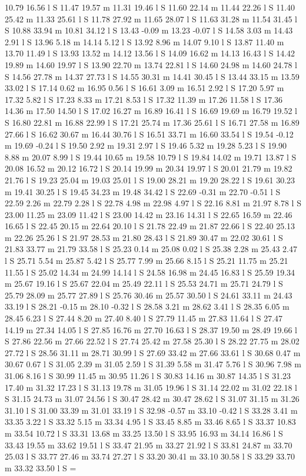 {10.79 16.56 l
S
11.47 19.57 m
11.31 19.46 l
S
11.60 22.14 m
11.44 22.26 l
S
11.40 25.42 m
11.33 25.61 l
S
11.78 27.92 m
11.65 28.07 l
S
11.63 31.28 m
11.54 31.45 l
S
10.88 33.94 m
10.81 34.12 l
S
13.43 -0.09 m
13.23 -0.07 l
S
14.58 3.03 m
14.43 2.91 l
S
13.96 5.18 m
14.14 5.12 l
S
13.92 8.96 m
14.07 9.10 l
S
13.87 11.40 m
13.70 11.49 l
S
13.93 13.52 m
14.12 13.56 l
S
14.09 16.62 m
14.13 16.43 l
S
14.42 19.89 m
14.60 19.97 l
S
13.90 22.70 m
13.74 22.81 l
S
14.60 24.98 m
14.60 24.78 l
S
14.56 27.78 m
14.37 27.73 l
S
14.55 30.31 m
14.41 30.45 l
S
13.44 33.15 m
13.59 33.02 l
S
17.14 0.62 m
16.95 0.56 l
S
16.61 3.09 m
16.51 2.92 l
S
17.20 5.97 m
17.32 5.82 l
S
17.23 8.33 m
17.21 8.53 l
S
17.32 11.39 m
17.26 11.58 l
S
17.36 14.36 m
17.50 14.50 l
S
17.02 16.27 m
16.89 16.41 l
S
16.69 19.69 m
16.79 19.52 l
S
16.80 22.81 m
16.88 22.99 l
S
17.21 25.74 m
17.36 25.61 l
S
16.71 27.58 m
16.89 27.66 l
S
16.62 30.67 m
16.44 30.76 l
S
16.51 33.71 m
16.60 33.54 l
S
19.54 -0.12 m
19.69 -0.24 l
S
19.50 2.92 m
19.31 2.97 l
S
19.46 5.32 m
19.28 5.23 l
S
19.90 8.88 m
20.07 8.99 l
S
19.44 10.65 m
19.58 10.79 l
S
19.84 14.02 m
19.71 13.87 l
S
20.08 16.52 m
20.12 16.72 l
S
20.14 19.99 m
20.34 19.97 l
S
20.01 21.79 m
19.82 21.76 l
S
19.23 25.04 m
19.03 25.01 l
S
19.00 28.21 m
19.20 28.22 l
S
19.61 30.23 m
19.41 30.25 l
S
19.45 34.23 m
19.48 34.42 l
S
22.69 -0.31 m
22.70 -0.51 l
S
22.59 2.26 m
22.79 2.28 l
S
22.78 4.98 m
22.98 4.97 l
S
22.16 8.81 m
21.97 8.78 l
S
23.00 11.25 m
23.09 11.42 l
S
23.00 14.42 m
23.16 14.31 l
S
22.65 16.59 m
22.46 16.65 l
S
22.45 20.15 m
22.64 20.10 l
S
21.78 22.49 m
21.87 22.66 l
S
22.40 25.13 m
22.26 25.26 l
S
21.97 28.53 m
21.80 28.43 l
S
21.89 30.47 m
22.02 30.61 l
S
21.83 33.77 m
21.79 33.58 l
S
25.23 0.14 m
25.08 0.02 l
S
25.38 2.28 m
25.43 2.47 l
S
25.71 5.54 m
25.87 5.42 l
S
25.77 7.99 m
25.66 8.15 l
S
25.21 11.75 m
25.21 11.55 l
S
25.02 14.34 m
24.99 14.14 l
S
24.58 16.98 m
24.45 16.83 l
S
25.59 19.34 m
25.67 19.16 l
S
25.67 22.04 m
25.49 22.11 l
S
25.53 24.71 m
25.71 24.79 l
S
25.79 28.09 m
25.77 27.89 l
S
25.76 30.46 m
25.57 30.50 l
S
24.61 33.11 m
24.43 33.19 l
S
28.21 -0.15 m
28.10 -0.32 l
S
28.58 3.21 m
28.62 3.41 l
S
28.35 6.05 m
28.45 6.23 l
S
27.44 8.20 m
27.40 8.40 l
S
27.79 11.45 m
27.83 11.64 l
S
27.47 14.19 m
27.34 14.05 l
S
27.85 16.76 m
27.70 16.63 l
S
28.37 19.50 m
28.49 19.66 l
S
27.86 22.56 m
27.66 22.52 l
S
27.74 25.42 m
27.58 25.30 l
S
28.22 27.75 m
28.02 27.72 l
S
28.56 31.11 m
28.71 30.99 l
S
27.69 33.42 m
27.66 33.61 l
S
30.68 0.47 m
30.67 0.67 l
S
31.05 2.39 m
31.05 2.59 l
S
31.39 5.58 m
31.47 5.76 l
S
30.96 7.98 m
31.06 8.16 l
S
30.99 11.45 m
30.95 11.26 l
S
30.83 14.16 m
30.87 14.35 l
S
31.23 17.40 m
31.32 17.23 l
S
31.13 19.78 m
31.05 19.96 l
S
31.14 22.02 m
31.02 22.18 l
S
31.15 24.73 m
31.07 24.56 l
S
30.47 28.42 m
30.47 28.62 l
S
31.07 31.15 m
31.26 31.10 l
S
31.00 33.39 m
31.01 33.19 l
S
32.98 -0.57 m
33.10 -0.42 l
S
33.28 3.41 m
33.35 3.22 l
S
33.32 5.15 m
33.34 4.95 l
S
33.45 8.85 m
33.46 8.65 l
S
33.37 10.83 m
33.54 10.72 l
S
33.31 13.68 m
33.25 13.50 l
S
33.95 16.93 m
34.14 16.86 l
S
33.43 19.55 m
33.62 19.51 l
S
33.47 21.95 m
33.27 21.92 l
S
33.81 24.87 m
33.70 25.03 l
S
33.77 27.46 m
33.74 27.27 l
S
33.20 30.41 m
33.10 30.58 l
S
33.29 33.70 m
33.32 33.50 l
S
} \newcount \THPb\THPb=\pdflastobj
